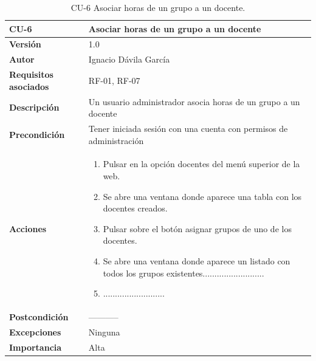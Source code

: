 \begin{table}[p]
	\centering
	\begin{tabularx}{\linewidth}{ p{} p{} }
		\toprule
		\textbf{CU-6}    & \textbf{Asociar horas de un grupo a un docente}\\
		\toprule
		\textbf{Versión}              & 1.0    \\
		\textbf{Autor}                & Ignacio Dávila García \\
		\textbf{Requisitos asociados} & RF-01, RF-07 \\
		\textbf{Descripción}          & Un usuario administrador asocia horas de un grupo a un docente \\
		\textbf{Precondición}         & Tener iniciada sesión con una cuenta con permisos de administración \\
		\textbf{Acciones}             &
		\begin{enumerate}
			\def\labelenumi{\arabic{enumi}.}
			\tightlist
			\item Pulsar en la opción docentes del menú superior de la web.
			\item Se abre una ventana donde aparece una tabla con los docentes creados.
			\item Pulsar sobre el botón asignar grupos de uno de los docentes.
			\item Se abre una ventana donde aparece un listado con todos los grupos existentes..........................
			\item ..........................
		\end{enumerate}\\
		\textbf{Postcondición}        & ----------- \\
		\textbf{Excepciones}          & Ninguna \\
		\textbf{Importancia}          & Alta \\
		\bottomrule
	\end{tabularx}
	\caption{CU-6 Asociar horas de un grupo a un docente.}
\end{table}

